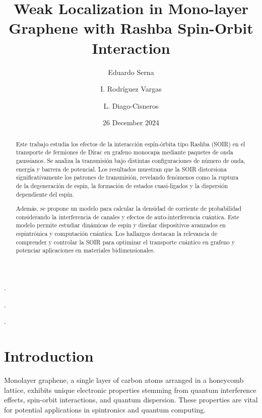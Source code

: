 \documentclass[twocolumn]{revtex4-2}
\begin{document}
    \title{Weak Localization in Mono-layer Graphene with Rashba Spin-Orbit Interaction}
    \author{Eduardo Serna}
    .
    \author{I. Rodríguez Vargas}
    .
    \author{L. Diago-Cisneros}
    .
    \date{26 December 2024}
    \maketitle

    \begin{abstract}
        Este trabajo estudia los efectos de la interacción espín-órbita tipo Rashba (SOIR) en el transporte de fermiones de Dirac en grafeno monocapa mediante paquetes de onda gaussianos.
        Se analiza la transmisión bajo distintas configuraciones de número de onda, energía y barrera de potencial.
        Los resultados muestran que la SOIR distorsiona significativamente los patrones de transmisión, revelando fenómenos como la ruptura de la degeneración de espín, la formación de estados cuasi-ligados y la dispersión dependiente del espín.

        Además, se propone un modelo para calcular la densidad de corriente de probabilidad considerando la interferencia de canales y efectos de auto-interferencia cuántica.
        Este modelo permite estudiar dinámicas de espín y diseñar dispositivos avanzados en espintrónica y computación cuántica.
        Los hallazgos destacan la relevancia de comprender y controlar la SOIR para optimizar el transporte cuántico en grafeno y potenciar aplicaciones en materiales bidimensionales.
    \end{abstract}


    \section{Introduction}\label{sec:introduction}

        Monolayer graphene, a single layer of carbon atoms arranged in a honeycomb lattice, exhibits unique electronic properties stemming from quantum interference effects, spin-orbit interactions, and quantum dispersion.
        These properties are vital for potential applications in spintronics and quantum computing.
\end{document}
